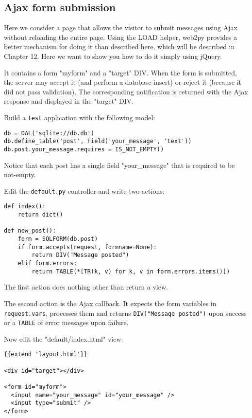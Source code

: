 \documentclass[justified,sixbynine,notoc]{tufte-book}
\def\ft{\small\tt}
\def\inxx#1{\index{#1}}
\begin{document}
\begin{fullwidth}
\goodbreak\subsection{Ajax form submission}

\inxx{asynchronous}

Here we consider a page that allows the visitor to submit messages using Ajax without reloading the entire page. Using the LOAD helper, web2py provides a better mechanism for doing it than described here, which will be described in Chapter 12. Here we want to show you how to do it simply using jQuery.

It contains a form "myform" and a "target" DIV. When the form is submitted, the server may accept it (and perform a database insert) or reject it (because it did not pass validation). The corresponding notification is returned with the Ajax response and displayed in the "target" DIV.

Build a {\ft test} application with the following model:
\begin{lstlisting}
db = DAL('sqlite://db.db')
db.define_table('post', Field('your_message', 'text'))
db.post.your_message.requires = IS_NOT_EMPTY()
\end{lstlisting}

Notice that each post has a single field "your\_message" that is required to be not-empty.

Edit the {\ft default.py} controller and  write two actions:
\begin{lstlisting}
def index():
    return dict()

def new_post():
    form = SQLFORM(db.post)
    if form.accepts(request, formname=None):
        return DIV("Message posted")
    elif form.errors:
        return TABLE(*[TR(k, v) for k, v in form.errors.items()])
\end{lstlisting}

The first action does nothing other than return a view.

The second action is the Ajax callback. It expects the form variables in {\ft request.vars}, processes them and returns {\ft DIV("Message posted")} upon success or a {\ft TABLE} of error messages upon failure.

Now edit the "default/index.html" view:
\begin{lstlisting}[keywords={}]
{{extend 'layout.html'}}

<div id="target"></div>

<form id="myform">
  <input name="your_message" id="your_message" />
  <input type="submit" />
</form>


\end{lstlisting}
\end{fullwidth}
\end{document}

